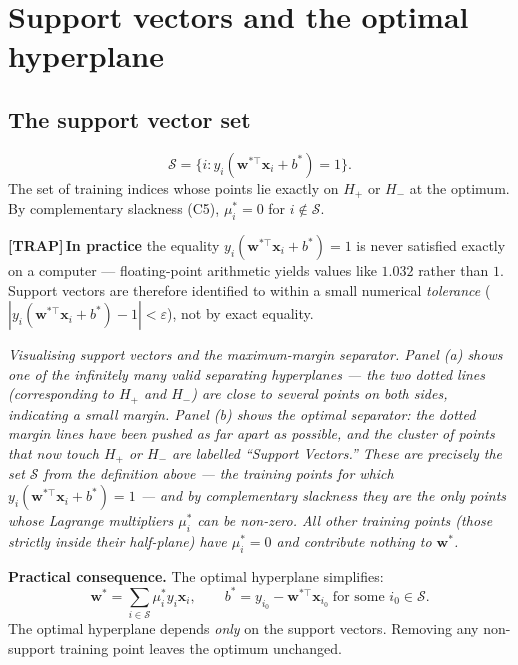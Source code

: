 \documentclass[11pt, a4paper]{article}
\newcommand{\trapflag}{\textcolor{trapBd}{\textbf{[TRAP]}}\,}
\begin{document}
\section{Support vectors and the optimal hyperplane}

\subsection{The support vector set}

\begin{defbox}
\[
\mathcal{S} = \big\{i : y_i(\mathbf{w}^{*\top}\mathbf{x}_i + b^*) = 1\big\}.
\]
The set of training indices whose points lie exactly on $H_+$ or $H_-$ at the optimum. By complementary slackness (C5), $\mu_i^* = 0$ for $i \notin \mathcal{S}$.
\end{defbox}

\trapflag{}\textbf{In practice} the equality $y_i(\mathbf{w}^{*\top}\mathbf{x}_i + b^*) = 1$ is never satisfied exactly on a computer — floating-point arithmetic yields values like $1.032$ rather than $1$. Support vectors are therefore identified to within a small numerical \emph{tolerance} ($|y_i(\mathbf{w}^{*\top}\mathbf{x}_i + b^*) - 1| < \varepsilon$), not by exact equality.

\begin{center}

\footnotesize\textit{Visualising support vectors and the maximum-margin separator. Panel (a) shows one of the infinitely many valid separating hyperplanes --- the two dotted lines (corresponding to $H_+$ and $H_-$) are close to several points on both sides, indicating a small margin. Panel (b) shows the \emph{optimal} separator: the dotted margin lines have been pushed as far apart as possible, and the cluster of points that now touch $H_+$ or $H_-$ are labelled ``Support Vectors.'' These are precisely the set $\mathcal{S}$ from the definition above --- the training points for which $y_i(\mathbf{w}^{*\top}\mathbf{x}_i + b^*) = 1$ --- and by complementary slackness they are the \emph{only} points whose Lagrange multipliers $\mu_i^*$ can be non-zero. All other training points (those strictly inside their half-plane) have $\mu_i^* = 0$ and contribute nothing to $\mathbf{w}^*$.}
\end{center}

\textbf{Practical consequence.} The optimal hyperplane simplifies:
\[
\boxed{\;\mathbf{w}^* = \sum_{i \in \mathcal{S}} \mu_i^* y_i \mathbf{x}_i, \qquad b^* = y_{i_0} - \mathbf{w}^{*\top}\mathbf{x}_{i_0} \;\text{for some }i_0 \in \mathcal{S}.\;}
\]
The optimal hyperplane depends \emph{only} on the support vectors. Removing any non-support training point leaves the optimum unchanged.
\end{document}
